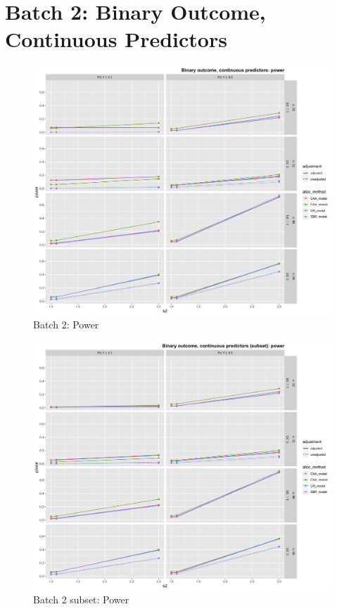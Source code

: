 \section[Binary Y, continuous X]{Batch 2: Binary Outcome, Continuous Predictors}

\begin{figure}[H]
	\includegraphics[width=\linewidth]{figures/b2_power_all_methods_adj_unadj}
	\caption{Batch 2: Power}
	\label{fig:c7b2p}
\end{figure}

\begin{figure}[H]
	\includegraphics[width=\linewidth]{figures/b2_sub_power_all_methods_adj_unadj}
	\caption{Batch 2 subset: Power}
	\label{fig:c7b2sp}
\end{figure}

